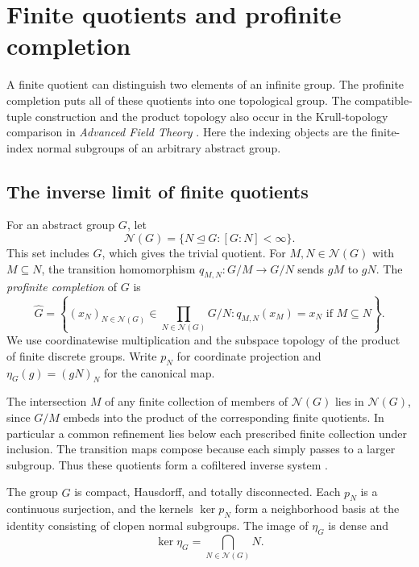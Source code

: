 \chapter{Finite quotients and profinite completion}
\label{ch:gr02-profinite}

A finite quotient can distinguish two elements of an infinite group.
The profinite completion puts all of these quotients into one
topological group. The compatible-tuple construction and the product
topology also occur in the Krull-topology comparison in
\emph{Advanced Field Theory} \cite[Results T04--T06]{field}. Here the
indexing objects are the finite-index normal subgroups of an arbitrary
abstract group.

\section{The inverse limit of finite quotients}

\begin{definition}
\label{def:gr02-completion}
For an abstract group \(G\), let
\[
  \mathcal N(G)=\{N\trianglelefteq G:[G:N]<\infty\}.
\]
This set includes \(G\), which gives the trivial quotient. For
\(M,N\in\mathcal N(G)\) with \(M\subseteq N\), the transition
homomorphism \(q_{M,N}\colon G/M\to G/N\) sends \(gM\) to \(gN\).
The \emph{profinite completion} of \(G\) is
\[
  \widehat G
  =\left\{(x_N)_{N\in\mathcal N(G)}\in\prod_{N\in\mathcal N(G)}G/N
          :q_{M,N}(x_M)=x_N\text{ if }M\subseteq N\right\}.
\]
We use coordinatewise multiplication and the subspace topology of the
product of finite discrete groups. Write \(p_N\) for coordinate
projection and \(\eta_G(g)=(gN)_N\) for the canonical map.
\end{definition}

The intersection \(M\) of any finite collection of members of
\(\mathcal N(G)\) lies in \(\mathcal N(G)\), since \(G/M\) embeds into
the product of the corresponding finite quotients. In particular a
common refinement lies below each prescribed finite collection under
inclusion. The transition maps compose because each simply passes to
a larger subgroup. Thus these quotients form a cofiltered inverse
system \cite[Definition 1.2.1 and Section 1.2]{profinite-source}.

\begin{proposition}
\label{prop:gr02-completion-topology}
The group \(\widehat G\) is compact, Hausdorff, and totally
disconnected. Each \(p_N\) is a continuous surjection, and the kernels
\(\ker p_N\) form a neighborhood basis at the identity consisting of
clopen normal subgroups. The image of \(\eta_G\) is dense and
\[
     \ker\eta_G=\bigcap_{N\in\mathcal N(G)}N .
\]
\end{proposition}

